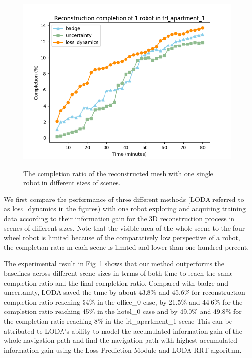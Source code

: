 \begin{figure}[h!]
{    \includegraphics[scale=0.35]{fig/single/1_completions_plot_frl_apartment_1.png}}
\vspace{-0.3cm}
\caption{The completion ratio of the reconstructed mesh with one single robot in different sizes of scenes.}
\label{fig:single_robot}
\end{figure}

We first compare the performance of three different methods (LODA referred to as loss\_dynamics in the figures) with one robot exploring and acquiring training data according to their information gain for the 3D reconstruction process in scenes of different sizes.
Note that the visible area of the whole scene to the four-wheel robot is limited because of the comparatively low perspective of a robot, the completion ratio in each scene is limited and lower than one hundred percent.

The experimental result in Fig~\ref{fig:single_robot} shows that our method outperforms the baselines across different scene sizes in terms of both time to reach the same completion ratio and the final completion ratio.
Compared with badge and uncertainty, LODA saved the time by about 43.8\% and 45.6\% for reconstruction completion ratio reaching 54\% in the office\_0 case,  by 21.5\% and 44.6\% for the completion ratio reaching 45\% in the hotel\_0 case and by 49.0\% and 49.8\% for the completion ratio reaching 8\% in the frl\_apartment\_1 scene
This can be attributed to LODA's ability to model the accumulated information gain of the whole navigation path and find the navigation path with highest accumulated information gain using the Loss Prediction Module and LODA-RRT algorithm.

